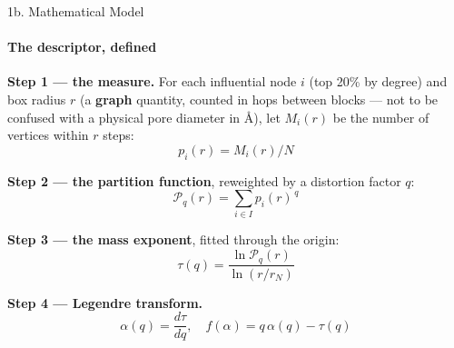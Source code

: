 \documentclass[aspectratio=169, 11pt]{beamer}
\begin{document}
\begin{frame}{1b. Mathematical Model}
\framesubtitle{The descriptor, defined}
\begin{center}
\begin{minipage}{0.68\textwidth}
\footnotesize
\setlength{\abovedisplayskip}{3pt}
\setlength{\belowdisplayskip}{3pt}
\setlength{\abovedisplayshortskip}{2pt}
\setlength{\belowdisplayshortskip}{2pt}

\textbf{Step 1 --- the measure.} For each influential node $i$ (top 20\% by degree) and box
radius $r$ (a \textbf{graph} quantity, counted in hops between blocks --- not to be confused
with a physical pore diameter in \AA), let $M_i(r)$ be the number of vertices within $r$
steps:
\[ p_i(r) = M_i(r)/N \]

\textbf{Step 2 --- the partition function}, reweighted by a distortion factor $q$:
\[ \mathcal{P}_q(r) = \sum_{i \in I} p_i(r)^{\,q} \]

\textbf{Step 3 --- the mass exponent}, fitted through the origin:
\[ \boxed{\ \tau(q) = \frac{\ln \mathcal{P}_q(r)}{\ln (r/r_N)}\ } \]

\textbf{Step 4 --- Legendre transform.}
\[ \alpha(q) = \frac{d\tau}{dq}, \quad f(\alpha) = q\,\alpha(q) - \tau(q) \]
\end{minipage}
\end{center}
\end{frame}

\end{document}
